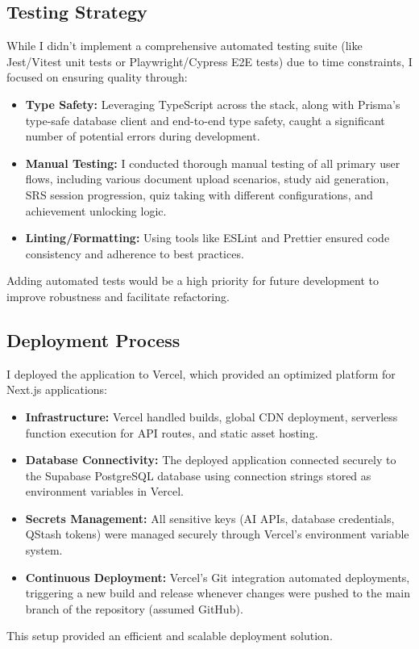 \documentclass[
	letterpaper,
	11pt
]{jdf}
\begin{document}
\subsection{Testing Strategy}
While I didn't implement a comprehensive automated testing suite (like Jest/Vitest unit tests or Playwright/Cypress E2E tests) due to time constraints, I focused on ensuring quality through:
\begin{itemize}
    \item \textbf{Type Safety:} Leveraging TypeScript across the stack, along with Prisma's type-safe database client and end-to-end type safety, caught a significant number of potential errors during development.
    \item \textbf{Manual Testing:} I conducted thorough manual testing of all primary user flows, including various document upload scenarios, study aid generation, SRS session progression, quiz taking with different configurations, and achievement unlocking logic.
    \item \textbf{Linting/Formatting:} Using tools like ESLint and Prettier ensured code consistency and adherence to best practices.
\end{itemize}
Adding automated tests would be a high priority for future development to improve robustness and facilitate refactoring.

\subsection{Deployment Process}
I deployed the application to Vercel, which provided an optimized platform for Next.js applications:
\begin{itemize}
    \item \textbf{Infrastructure:} Vercel handled builds, global CDN deployment, serverless function execution for API routes, and static asset hosting.
    \item \textbf{Database Connectivity:} The deployed application connected securely to the Supabase PostgreSQL database using connection strings stored as environment variables in Vercel.
    \item \textbf{Secrets Management:} All sensitive keys (AI APIs, database credentials, QStash tokens) were managed securely through Vercel's environment variable system.
    \item \textbf{Continuous Deployment:} Vercel's Git integration automated deployments, triggering a new build and release whenever changes were pushed to the main branch of the repository (assumed GitHub).
\end{itemize}
This setup provided an efficient and scalable deployment solution.
\end{document}
